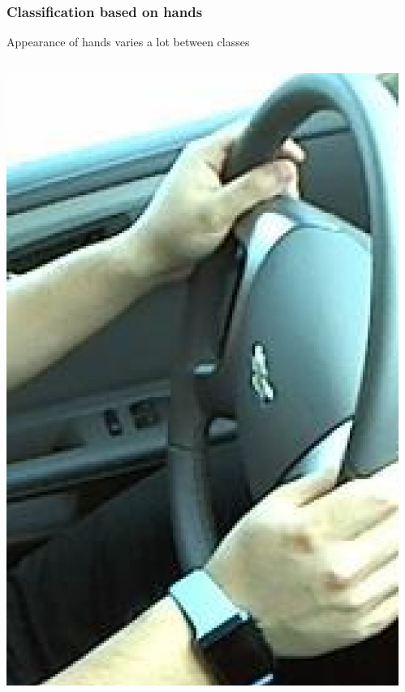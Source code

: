 \documentclass{beamer}
\begin{document}
	\begin{frame}
		\frametitle{Classification based on hands}
		Appearance of hands varies a lot between classes
		\begin{columns}
			\begin{column}{0.5\textwidth}
				\begin{center}			
					\includegraphics[height=0.5\textheight]{handpose_example_3_cut}\\			
				\end{center}
			\end{column}
			\begin{column}{0.5\textwidth}
				\begin{center}			

\end{center}
\end{column}
\end{columns}
\end{frame}
\end{document}
